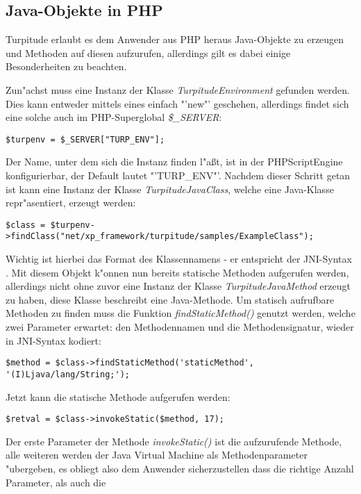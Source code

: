 \subsection{Java-Objekte in PHP}
\label{sec:app1:jobj}

Turpitude erlaubt es dem Anwender aus PHP heraus Java-Objekte zu erzeugen und Methoden
auf diesen aufzurufen, allerdings gilt es dabei einige Besonderheiten zu beachten.

Zun"achst muss eine Instanz der Klasse \emph{TurpitudeEnvironment} gefunden werden.
Dies kann entweder mittels eines einfach "'new"' geschehen, allerdings findet sich
eine solche auch im PHP-Superglobal \emph{\$\_SERVER}:
\begin{lstlisting}[caption=TurpitudeEnvironment-Instanz]
$turpenv = $_SERVER["TURP_ENV"];
\end{lstlisting}
Der Name, unter dem sich die Instanz finden l"a\ss t, ist in der PHPScriptEngine konfigurierbar,
der Default lautet "'TURP\_ENV"'.
Nachdem dieser Schritt getan ist kann eine Instanz der Klasse \emph{TurpitudeJavaClass}, 
welche eine Java-Klasse repr"asentiert, erzeugt werden:
\begin{lstlisting}[caption=Java-Klassen finden]
$class = $turpenv->findClass("net/xp_framework/turpitude/samples/ExampleClass");
\end{lstlisting}
Wichtig ist hierbei das Format des Klassennamens - er entspricht der JNI-Syntax \cite{JNIHP}.
Mit diesem Objekt k"onnen nun bereits statische Methoden aufgerufen werden, allerdings nicht
ohne zuvor eine Instanz der Klasse \emph{TurpitudeJavaMethod} erzeugt zu haben, diese Klasse
beschreibt eine Java-Methode. Um statisch aufrufbare Methoden zu finden muss die Funktion
\emph{findStaticMethod()} genutzt werden, welche zwei Parameter erwartet: den Methodennamen
und die Methodensignatur, wieder in JNI-Syntax kodiert:
\begin{lstlisting}[caption=statische Methoden finden]
$method = $class->findStaticMethod('staticMethod', '(I)Ljava/lang/String;');
\end{lstlisting}
Jetzt kann die statische Methode aufgerufen werden:
\begin{lstlisting}[caption=statischer Methodenaufruf]
$retval = $class->invokeStatic($method, 17);
\end{lstlisting}
Der erste Parameter der Methode \emph{invokeStatic()} ist die aufzurufende Methode,
alle weiteren werden der Java Virtual Machine als Methodenparameter "ubergeben, es
obliegt also dem Anwender sicherzustellen dass die richtige Anzahl Parameter, als auch die

